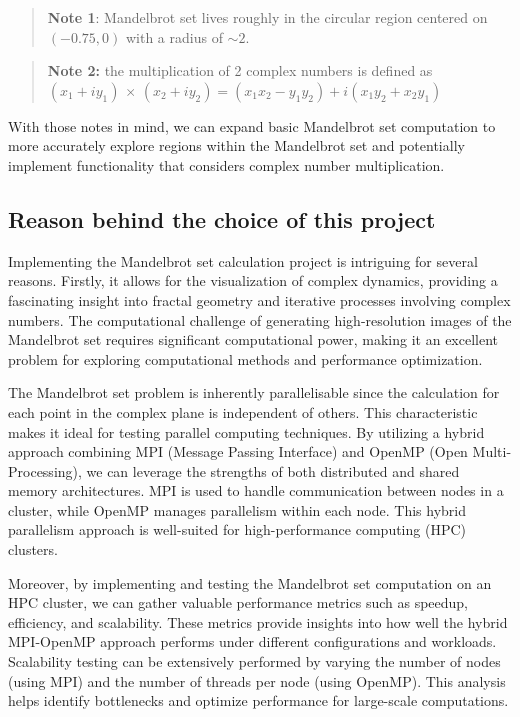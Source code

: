 \documentclass[
]{article}
\begin{document}
\begin{quote}
\textbf{Note 1}: Mandelbrot set lives roughly in the circular region
centered on \((-0.75, 0)\) with a radius of \(\sim 2\).
\end{quote}

\begin{quote}
\textbf{Note 2:} the multiplication of 2 complex numbers is defined as
\((x_1 + iy_1)\,\times\,(x_2+iy_2) = (x_1x_2 - y_1y_2) + i(x_1y_2+x_2y_1)\)
\end{quote}

With those notes in mind, we can expand basic Mandelbrot set computation
to more accurately explore regions within the Mandelbrot set and
potentially implement functionality that considers complex number
multiplication.

\subsection{Reason behind the choice of this
project}\label{reason-behind-the-choice-of-this-project}

Implementing the Mandelbrot set calculation project is intriguing for
several reasons. Firstly, it allows for the visualization of complex
dynamics, providing a fascinating insight into fractal geometry and
iterative processes involving complex numbers. The computational
challenge of generating high-resolution images of the Mandelbrot set
requires significant computational power, making it an excellent problem
for exploring computational methods and performance optimization.

The Mandelbrot set problem is inherently parallelisable since the
calculation for each point in the complex plane is independent of
others. This characteristic makes it ideal for testing parallel
computing techniques. By utilizing a hybrid approach combining MPI
(Message Passing Interface) and OpenMP (Open Multi-Processing), we can
leverage the strengths of both distributed and shared memory
architectures. MPI is used to handle communication between nodes in a
cluster, while OpenMP manages parallelism within each node. This hybrid
parallelism approach is well-suited for high-performance computing (HPC)
clusters.

Moreover, by implementing and testing the Mandelbrot set computation on
an HPC cluster, we can gather valuable performance metrics such as
speedup, efficiency, and scalability. These metrics provide insights
into how well the hybrid MPI-OpenMP approach performs under different
configurations and workloads. Scalability testing can be extensively
performed by varying the number of nodes (using MPI) and the number of
threads per node (using OpenMP). This analysis helps identify
bottlenecks and optimize performance for large-scale computations.
\end{document}
